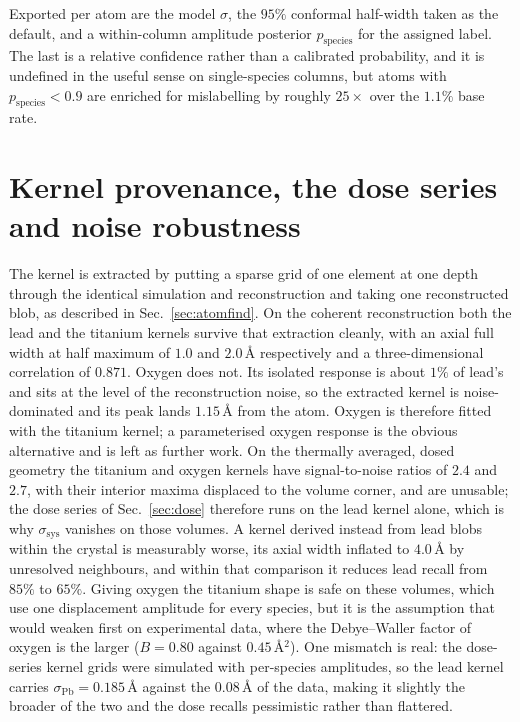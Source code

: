 \documentclass[aps,prb,twocolumn,superscriptaddress,floatfix,nofootinbib]{revtex4-2}
\begin{document}
Exported per atom are the model $\sigma$, the $95\%$ conformal half-width taken as the default, and a within-column amplitude posterior $p_{\mathrm{species}}$ for the assigned label. The last is a relative confidence rather than a calibrated probability, and it is undefined in the useful sense on single-species columns, but atoms with $p_{\mathrm{species}}<0.9$ are enriched for mislabelling by roughly $25\times$ over the $1.1\%$ base rate.

\section{Kernel provenance, the dose series and noise robustness}
\label{app:kernel}
\setcounter{table}{0}
\setcounter{figure}{0}

The kernel is extracted by putting a sparse grid of one element at one depth through the identical simulation and reconstruction and taking one reconstructed blob, as described in Sec.~\ref{sec:atomfind}. On the coherent reconstruction both the lead and the titanium kernels survive that extraction cleanly, with an axial full width at half maximum of $1.0$ and $2.0$\,\AA{} respectively and a three-dimensional correlation of $0.871$. Oxygen does not. Its isolated response is about $1\%$ of lead's and sits at the level of the reconstruction noise, so the extracted kernel is noise-dominated and its peak lands $1.15$\,\AA{} from the atom. Oxygen is therefore fitted with the titanium kernel; a parameterised oxygen response is the obvious alternative and is left as further work. On the thermally averaged, dosed geometry the titanium and oxygen kernels have signal-to-noise ratios of $2.4$ and $2.7$, with their interior maxima displaced to the volume corner, and are unusable; the dose series of Sec.~\ref{sec:dose} therefore runs on the lead kernel alone, which is why $\sigma_{\mathrm{sys}}$ vanishes on those volumes. A kernel derived instead from lead blobs within the crystal is measurably worse, its axial width inflated to $4.0$\,\AA{} by unresolved neighbours, and within that comparison it reduces lead recall from $85\%$ to $65\%$. Giving oxygen the titanium shape is safe on these volumes, which use one displacement amplitude for every species, but it is the assumption that would weaken first on experimental data, where the Debye--Waller factor of oxygen is the larger ($B=0.80$ against $0.45$\,\AA$^2$). One mismatch is real: the dose-series kernel grids were simulated with per-species amplitudes, so the lead kernel carries $\sigma_{\mathrm{Pb}}=0.185$\,\AA{} against the $0.08$\,\AA{} of the data, making it slightly the broader of the two and the dose recalls pessimistic rather than flattered.
\end{document}
